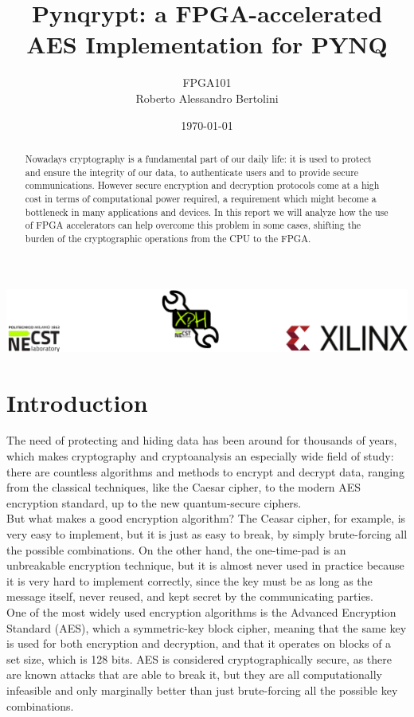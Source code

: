 \documentclass[12pt,oneside,a4paper]{article}
\title{\textbf{Pynqrypt: a FPGA-accelerated AES Implementation for PYNQ}}
\author{FPGA101\\Roberto Alessandro Bertolini}
\date{\today}
\begin{document}
\begin{titlepage}
	\centering
	\clearpage
	\maketitle
	\thispagestyle{empty}
	\vspace*{1cm}
	\vfill
	\centering
	\includegraphics{footer.png}
\end{titlepage}


\begin{abstract}
Nowadays cryptography is a fundamental part of our daily life: it is used to protect and ensure the integrity of our data, to authenticate users and to provide secure communications.
However secure encryption and decryption protocols come at a high cost in terms of computational power required, a requirement which might become a bottleneck in many applications and devices.
In this report we will analyze how the use of FPGA accelerators can help overcome this problem in some cases, shifting the burden of the cryptographic operations from the CPU to the FPGA.
\end{abstract}

\section{Introduction} \label{sec:intro}
The need of protecting and hiding data has been around for thousands of years, which makes cryptography and cryptoanalysis an especially wide field of study: there are countless algorithms and methods to encrypt and decrypt data, ranging from the classical techniques, like the Caesar cipher, to the modern AES encryption standard, up to the new quantum-secure ciphers.
\\
But what makes a good encryption algorithm? The Ceasar cipher, for example, is very easy to implement, but it is just as easy to break, by simply brute-forcing all the possible combinations.
On the other hand, the one-time-pad is an unbreakable encryption technique, but it is almost never used in practice because it is very hard to implement correctly, since the key must be as long as the message itself, never reused, and kept secret by the communicating parties.
\\
One of the most widely used encryption algorithms is the Advanced Encryption Standard (AES), which a symmetric-key block cipher, meaning that the same key is used for both encryption and decryption, and that it operates on blocks of a set size, which is 128 bits.
AES is considered cryptographically secure, as there are known attacks that are able to break it, but they are all computationally infeasible and only marginally better than just brute-forcing all the possible key combinations.
\end{document}
